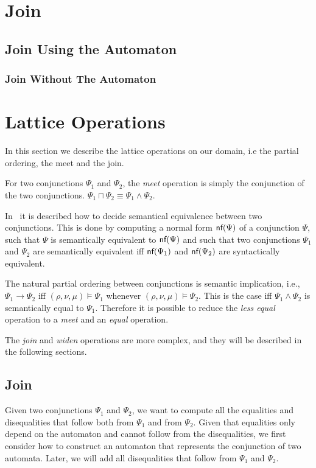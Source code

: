 \section{Join}

\subsection{Join Using the Automaton}

\subsubsection{Join Without The Automaton}


\section{Lattice Operations}

In this section we describe the lattice operations on our domain, i.e the partial ordering, the meet and the join.

For two conjunctions $\Psi_1$ and $\Psi_2$, the \emph{meet} operation is simply the conjunction of the two conjunctions. $\Psi_1 \sqcap \Psi_2 \equiv \Psi_1 \land \Psi_2$.

In~\cite{2pointer} it is described how to decide semantical equivalence between two conjunctions.
This is done by computing a normal form $\textsf{nf}(\Psi)$ of a conjunction $\Psi$, such that $\Psi$ is semantically equivalent to $\textsf{nf}(\Psi)$ and such that two conjunctions $\Psi_1$ and $\Psi_2$ are semantically equivalent iff $\textsf{nf}(\Psi_1)$ and $\textsf{nf}(\Psi_2)$ are syntactically equivalent.

The natural partial ordering between conjunctions is semantic implication, i.e.,
$\Psi_1 \rightarrow \Psi_2$
iff $(\rho, \nu, \mu) \models \Psi_1$ whenever $(\rho, \nu, \mu) \models \Psi_2$.
This is the case iff $\Psi_1 \land \Psi_2$ is semantically equal to $\Psi_1$. Therefore it is possible to reduce the \emph{less equal} operation to a \emph{meet} and an \emph{equal} operation.

The \emph{join} and \emph{widen} operations are more complex, and they will be described in the following sections.

\subsection{Join}

Given two conjunctions $\Psi_1$ and $\Psi_2$, we want to compute all the equalities and disequalities that follow both from $\Psi_1$ and from $\Psi_2$.
Given that equalities only depend on the automaton and cannot follow from the disequalities, we first consider how to construct an automaton that represents the conjunction of two automata.
Later, we will add all disequalities that follow from $\Psi_1$ and $\Psi_2$.

